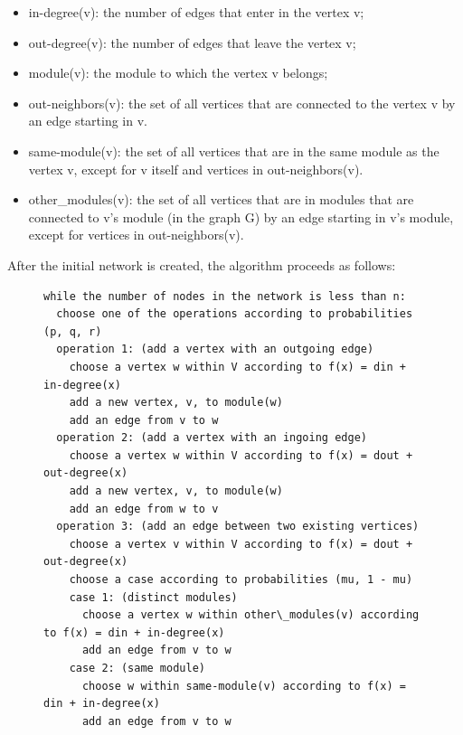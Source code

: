 \begin{itemize}

\item in-degree(v): the number of edges that enter in the vertex v;

\item out-degree(v): the number of edges that leave the vertex v;

\item module(v): the module to which the vertex v belongs;

\item out-neighbors(v): the set of all vertices that are connected to the vertex
v by an edge starting in v.

\item same-module(v): the set of all vertices that are in the same module as the
vertex v, except for v itself and vertices in out-neighbors(v).

\item other\_modules(v): the set of all vertices that are in modules that are
connected to v's module (in the graph G) by an edge starting in v's module,
except for vertices in out-neighbors(v).

\end{itemize}

After the initial network is created, the algorithm proceeds as follows:

\begin{figure}
\begin{verbatim}
while the number of nodes in the network is less than n:
  choose one of the operations according to probabilities (p, q, r)
  operation 1: (add a vertex with an outgoing edge)
    choose a vertex w within V according to f(x) = din + in-degree(x)
    add a new vertex, v, to module(w)
    add an edge from v to w
  operation 2: (add a vertex with an ingoing edge)
    choose a vertex w within V according to f(x) = dout + out-degree(x)
    add a new vertex, v, to module(w)
    add an edge from w to v
  operation 3: (add an edge between two existing vertices)
    choose a vertex v within V according to f(x) = dout + out-degree(x)
    choose a case according to probabilities (mu, 1 - mu)
    case 1: (distinct modules)
  	  choose a vertex w within other\_modules(v) according to f(x) = din + in-degree(x)
      add an edge from v to w
    case 2: (same module)
      choose w within same-module(v) according to f(x) = din + in-degree(x)
      add an edge from v to w
\end{verbatim}
\end{figure}

